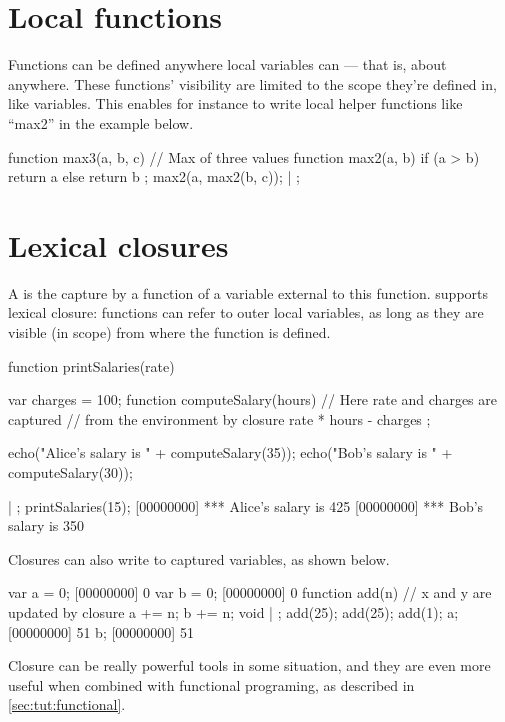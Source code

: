 \section{Local functions}

Functions can be defined anywhere local variables can --- that is,
about anywhere. These functions' visibility are limited to the scope
they're defined in, like variables. This enables for instance to write
local helper functions like ``max2'' in the example below.

\begin{urbiscript}
function max3(a, b, c) // Max of three values
{
  function max2(a, b)
  {
    if (a > b)
      return a
    else
      return b
  };
  max2(a, max2(b, c));
} | {};
\end{urbiscript}

\section{Lexical closures}

A  is the capture by a function of a variable external to this
function. \us supports lexical closure: functions can refer to outer
local variables, as long as they are visible (in scope) from where
the function is defined.

\begin{urbiscript}
function printSalaries(rate)
{
  var charges = 100;
  function computeSalary(hours)
  {
    // Here rate and charges are captured
    // from the environment by closure
    rate * hours - charges
  };

  echo("Alice's salary is " + computeSalary(35));
  echo("Bob's salary is " + computeSalary(30));
} | {};
printSalaries(15);
[00000000] *** Alice's salary is 425
[00000000] *** Bob's salary is 350
\end{urbiscript}

Closures can also write to captured variables, as shown below.

\begin{urbiscript}
var a = 0;
[00000000] 0
var b = 0;
[00000000] 0
function add(n)
{
  // x and y are updated by closure
  a += n;
  b += n;
  void
} | {};
add(25);
add(25);
add(1);
a;
[00000000] 51
b;
[00000000] 51
\end{urbiscript}

Closure can be really powerful tools in some situation, and they are
even more useful when combined with functional programing, as
described in \autoref{sec:tut:functional}.



